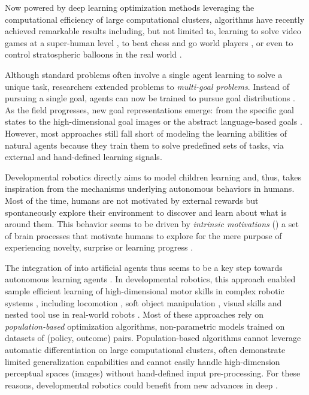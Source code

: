 
Now powered by deep learning optimization methods leveraging the computational efficiency of large computational clusters, \rl algorithms have recently achieved remarkable results including, but not limited to, learning to solve video games at a super-human level \cite{mnih2015human}, to beat chess and go world players \cite{silver2016mastering}, or even to control stratospheric balloons in the real world \cite{bellemare2020autonomous}.

Although standard \rl problems often involve a single agent learning to solve a unique task, \rl researchers  extended \rl problems to \textit{multi-goal \rl problems}. Instead of pursuing a single goal, agents can now be trained to pursue goal distributions \cite{kaelbling1993learning,sutton2011horde,schaul2015universal}. As the field progresses, new goal representations emerge: from the specific goal states to the high-dimensional goal images or the abstract language-based goals \cite{Luketina2019}. However, most approaches still fall short of modeling the learning abilities of natural agents because they train them to solve predefined sets of tasks, via external and hand-defined learning signals.

Developmental robotics directly aims to model children learning and, thus, takes inspiration from the mechanisms underlying autonomous behaviors in humans. Most of the time, humans are not motivated by external rewards but spontaneously explore their environment to discover and learn about what is around them. This behavior seems to be driven by \textit{intrinsic motivations} (\ims) a set of brain processes that motivate humans to explore for the mere purpose of experiencing novelty, surprise or learning progress \cite{berlyne1966curiosity,gopnik1999scientist,kidd2015psychology,oudeyer2016evolution,gottlieb2018towards}.

The integration of \ims into artificial agents thus seems to be a key step towards autonomous learning agents \cite{schmidhuber1991possibility,kaplan2007search}. In developmental robotics, this approach enabled sample efficient learning of high-dimensional motor skills in complex robotic systems \cite{santucci2020intrinsically}, including locomotion \cite{baranes2013active,martius2013information}, soft object manipulation \cite{rolf2013efficient,nguyen2014socially}, visual skills \cite{lonini2013robust} and nested tool use in real-world robots \cite{imgep}. Most of these approaches rely on \textit{population-based} optimization algorithms, non-parametric models trained on datasets of (policy, outcome) pairs. Population-based algorithms cannot leverage automatic differentiation on large computational clusters, often demonstrate limited generalization capabilities and cannot easily handle high-dimension perceptual spaces (\eg images) without hand-defined input pre-processing. For these reasons, developmental robotics could benefit from new advances in deep \rl.

